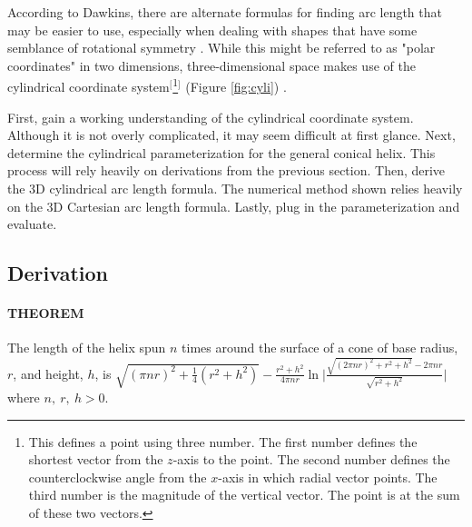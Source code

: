 \documentclass{article}
\begin{document}
According to Dawkins, there are alternate formulas for finding arc length that may be easier to use, especially when dealing with shapes that have some semblance of rotational symmetry \cite{Bib:polararc}. While this might be referred to as "polar coordinates" in two dimensions, three-dimensional space makes use of the cylindrical coordinate system$^[$\footnote{This defines a point using three number. The first number defines the shortest vector from the $z$-axis to the point. The second number defines the counterclockwise angle from the $x$-axis in which radial vector points. The third number is the magnitude of the vertical vector. The point is at the sum of these two vectors.}$^]$ (Figure \ref{fig:cyli}) \cite{Bib:cylcords}.\par
First, gain a working understanding of the cylindrical coordinate system. Although it is not overly complicated, it may seem difficult at first glance. Next, determine the cylindrical parameterization for the general conical helix. This process will rely heavily on derivations from the previous section. Then, derive the 3D cylindrical arc length formula. The numerical method shown relies heavily on the 3D Cartesian arc length formula. Lastly, plug in the parameterization and evaluate.


\subsection{Derivation}\label{ssec:cyl}
\paragraph{THEOREM} The length of the helix spun $n$ times around the surface of a cone of base radius, $r$, and height, $h$, is $\sqrt{(\pi nr)^2+\frac{1}{4}\left(r^2+h^2\right)}-\frac{r^2+h^2}{4\pi nr}\ln\bigg|\frac{\sqrt{(2\pi nr)^2+r^2+h^2}-2\pi nr}{\sqrt{r^2+h^2}}\bigg|$ where $n,\ r,\ h>0$.
\smallskip
\end{document}
